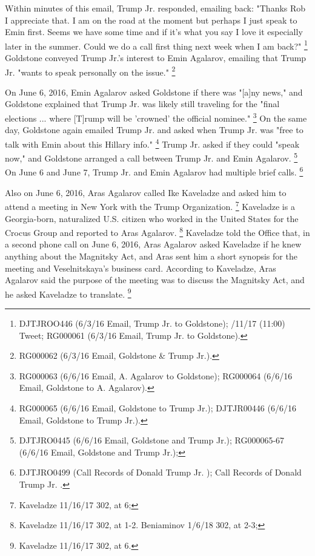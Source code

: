 Within minutes of this email, Trump Jr. responded, emailing back: "Thanks Rob I appreciate that.
I am on the road at the moment but perhaps I just speak to Emin first.
Seems we have some time and if it's what you say I love it especially later in the summer.
Could we do a call first thing next week when I am back?"%
\footnote{DJTJROO446 (6/3/16 Email, Trump Jr. to Goldstone);
/11/17 (11:00) Tweet;
RG000061 (6/3/16 Email, Trump Jr. to Goldstone).}
Goldstone conveyed Trump Jr.'s interest to Emin Agalarov, emailing that Trump Jr. "wants to speak personally on the issue."%
\footnote{ RG000062 (6/3/16 Email, Goldstone \& Trump Jr.).}

On June 6, 2016, Emin Agalarov asked Goldstone if there was "[a]ny news," and Goldstone explained that Trump Jr. was likely still traveling for the "final elections ... where [T]rump will be 'crowned' the official nominee."%
\footnote{RG000063 (6/6/16 Email, A. Agalarov to Goldstone);
RG000064 (6/6/16 Email, Goldstone to A. Agalarov).}
On the same day, Goldstone again emailed Trump Jr. and asked when Trump Jr. was "free to talk with Emin about this Hillary info."%
\footnote{RG000065 (6/6/16 Email, Goldstone to Trump Jr.);
DJTJR00446 (6/6/16 Email, Goldstone to Trump Jr.).}
Trump Jr. asked if they could "speak now," and Goldstone arranged a call between Trump Jr. and Emin Agalarov.%
\footnote{DJTJRO0445 (6/6/16 Email, Goldstone and Trump Jr.);
RG000065-67 (6/6/16 Email, Goldstone and Trump Jr.);
}
On June 6 and June 7, Trump Jr. and Emin Agalarov had multiple brief calls.%
\footnote{DJTJRO0499 (Call Records of Donald Trump Jr. );
Call Records of Donald Trump Jr. .}

Also on June 6, 2016, Aras Agalarov called Ike Kaveladze and asked him to attend a meeting in New York with the Trump Organization.%
\footnote{Kaveladze 11/16/17 302, at 6; }
Kaveladze is a Georgia-born, naturalized U.S. citizen who worked in the United States for the Crocus Group and reported to Aras Agalarov.%
\footnote{Kaveladze 11/16/17 302, at 1-2.
 Beniaminov 1/6/18 302, at 2-3;
}
Kaveladze told the Office that, in a second phone call on June 6, 2016, Aras Agalarov asked Kaveladze if he knew anything about the Magnitsky Act, and Aras sent him a short synopsis for the meeting and Veselnitskaya's business card.
According to Kaveladze, Aras Agalarov said the purpose of the meeting was to discuss the Magnitsky Act, and he asked Kaveladze to translate.%
\footnote{Kaveladze 11/16/17 302, at 6.}

